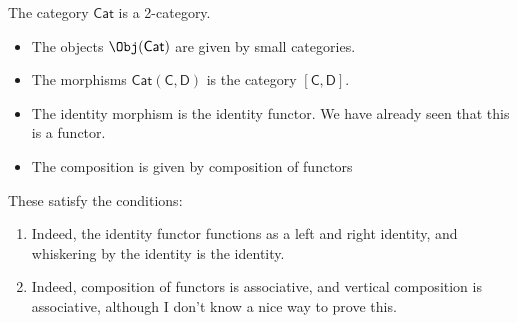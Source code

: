 \documentclass[main.tex]{subfiles}
\begin{document}
\begin{example}
  The category $\mathsf{Cat}$ is a 2-category.

  \begin{itemize}
    \item The objects $\Obj(\mathsf{Cat})$ are given by small categories.

    \item The morphisms $\mathsf{Cat}(\mathsf{C}, \mathsf{D})$ is the category $[\mathsf{C}, \mathsf{D}]$.

    \item The identity morphism is the identity functor. We have already seen that this is a functor.

    \item The composition is given by composition of functors
  \end{itemize}
  These satisfy the conditions:
  \begin{enumerate}
    \item Indeed, the identity functor functions as a left and right identity, and whiskering by the identity is the identity.

    \item Indeed, composition of functors is associative, and vertical composition is associative, although I don't know a nice way to prove this.
  \end{enumerate}
\end{example}
\end{document}
